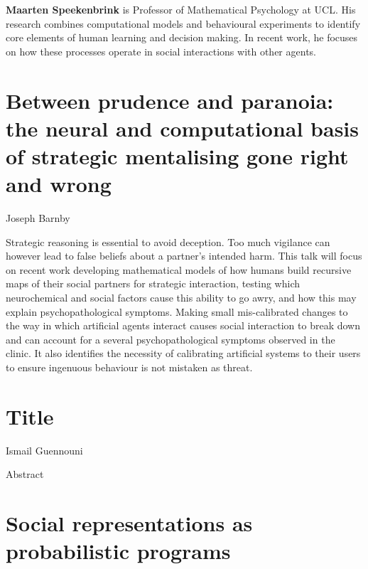 \documentclass[10pt, letterpaper]{article}
\begin{document}
\textbf{Maarten Speekenbrink} is Professor of Mathematical Psychology at
UCL. His research combines computational models and behavioural
experiments to identify core elements of human learning and decision
making. In recent work, he focuses on how these processes operate in
social interactions with other agents.

\hypertarget{between-prudence-and-paranoia-the-neural-and-computational-basis-of-strategic-mentalising-gone-right-and-wrong}{%
\section{Between prudence and paranoia: the neural and computational
basis of strategic mentalising gone right and
wrong}\label{between-prudence-and-paranoia-the-neural-and-computational-basis-of-strategic-mentalising-gone-right-and-wrong}}

\begin{center}
Joseph Barnby
\end{center}

Strategic reasoning is essential to avoid deception. Too much vigilance
can however lead to false beliefs about a partner's intended harm. This
talk will focus on recent work developing mathematical models of how
humans build recursive maps of their social partners for strategic
interaction, testing which neurochemical and social factors cause this
ability to go awry, and how this may explain psychopathological
symptoms. Making small mis-calibrated changes to the way in which
artificial agents interact causes social interaction to break down and
can account for a several psychopathological symptoms observed in the
clinic. It also identifies the necessity of calibrating artificial
systems to their users to ensure ingenuous behaviour is not mistaken as
threat.

\hypertarget{title}{%
\section{Title}\label{title}}

\begin{center}
Ismail Guennouni
\end{center}

Abstract

\hypertarget{social-representations-as-probabilistic-programs}{%
\section{Social representations as probabilistic
programs}\label{social-representations-as-probabilistic-programs}}
\end{document}
